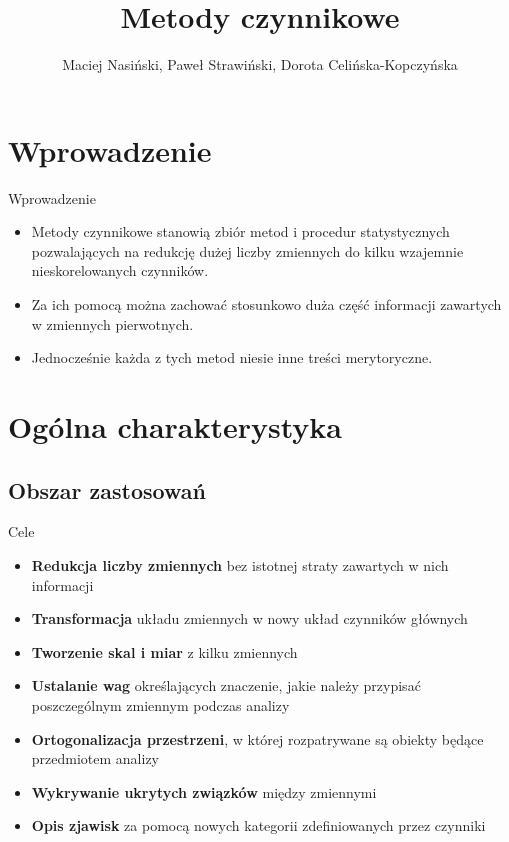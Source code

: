 \documentclass{beamer}
\begin{document}
\begin{frame}
\title[Tytuł]{Metody czynnikowe}

\author{Maciej Nasiński, Paweł Strawiński, Dorota Celińska-Kopczyńska}

\titlepage
\end{frame}
\begin{frame}[allowframebreaks]
  \tableofcontents
\end{frame}

\section{Wprowadzenie}
\begin{frame}{Wprowadzenie}
  \begin{itemize}
  \item Metody czynnikowe stanowią zbiór metod i procedur statystycznych pozwalających na redukcję dużej liczby zmiennych do kilku wzajemnie nieskorelowanych czynników.
  \item Za ich pomocą można zachować stosunkowo duża część informacji zawartych w zmiennych pierwotnych.
  \item Jednocześnie każda z tych metod niesie inne treści merytoryczne.
  \end{itemize}
\end{frame}

\section{Ogólna charakterystyka}
\subsection{Obszar zastosowań}
\begin{frame}{Cele}
  \begin{itemize}
  \item \textbf{Redukcja liczby zmiennych} bez istotnej straty zawartych w nich informacji
  \item \textbf{Transformacja} układu zmiennych w nowy układ czynników głównych
  \item \textbf{Tworzenie skal i miar} z kilku zmiennych
  \item \textbf{Ustalanie wag} określających znaczenie, jakie należy przypisać poszczególnym zmiennym podczas analizy
  \item \textbf{Ortogonalizacja przestrzeni}, w której rozpatrywane są obiekty będące przedmiotem analizy
  \item \textbf{Wykrywanie ukrytych związków} między zmiennymi
  \item \textbf{Opis zjawisk} za pomocą nowych kategorii zdefiniowanych przez czynniki
  \end{itemize}
\end{frame}
\end{document}
